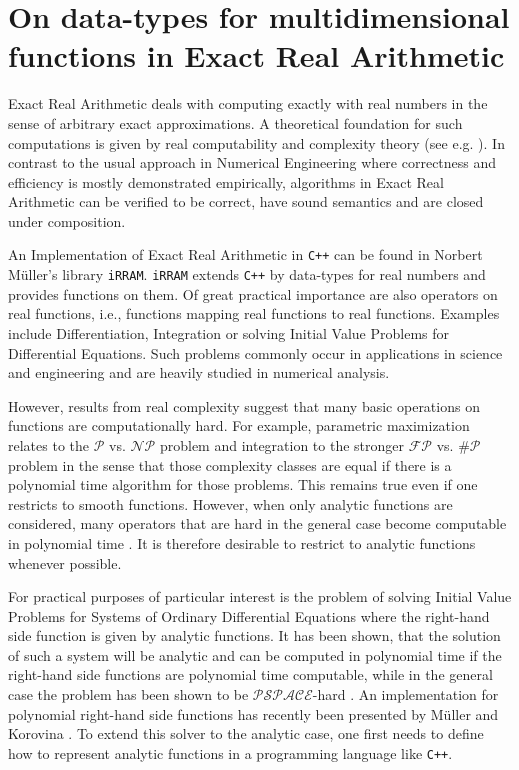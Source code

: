 \documentclass{article}
\newcommand{\p}{\ensuremath{\mathcal P}\xspace}
\newcommand{\np}{\ensuremath{\mathcal{NP}}\xspace}
\newcommand{\fp}{\ensuremath{\mathcal{FP}}\xspace}
\newcommand{\sharpp}{\ensuremath{\# \mathcal{P}}\xspace}
\newcommand{\pspace}{\ensuremath{ \mathcal{PSPACE}}\xspace}
\newcommand{\cc}{\texttt{C++}\xspace}
\newcommand{\irram}{\texttt{iRRAM}\xspace}
\begin{document}
\section*{On data-types for multidimensional functions in Exact Real Arithmetic}
Exact Real Arithmetic deals with computing exactly with real numbers in the sense of arbitrary exact approximations. 
A theoretical foundation for such computations is given by real computability and complexity theory (see e.g. \cite{MR0089809, MR1137517,Weihrauch}).
In contrast to the usual approach in Numerical Engineering where correctness and efficiency is mostly demonstrated empirically, algorithms in Exact Real Arithmetic can be verified to be correct, have sound semantics and are closed under composition.


An Implementation of Exact Real Arithmetic in \cc can be found in Norbert Müller's library \irram \cite{Mueller00}.
\irram extends \cc by data-types for real numbers and provides functions on them.
Of great practical importance are also operators on real functions, i.e., functions mapping real functions to real functions.
Examples include Differentiation, Integration or solving Initial Value Problems for Differential Equations.
Such problems commonly occur in applications in science and engineering and are heavily studied in numerical analysis.

However, results from real complexity suggest that many basic operations on functions are computationally hard. 
For example, parametric maximization relates to the $\p$ vs. $\np$ problem \cite{MR666209} and integration to the stronger $\fp$ vs. $\sharpp$ problem \cite{MR748898} in the sense that those complexity classes are equal if there is a polynomial time algorithm for those problems.
This remains true even if one restricts to smooth functions.
However, when only analytic functions are considered, many operators that are hard in the general case become computable in polynomial time \cite{Kawamura2012}.
It is therefore desirable to restrict to analytic functions whenever possible.

For practical purposes of particular interest is the problem of solving Initial Value Problems for Systems of Ordinary Differential Equations where the right-hand side function is given by analytic functions. 
It has been shown, that the solution of such a system will be analytic and can be computed in polynomial time if the right-hand side functions are polynomial time computable, while in the general case the problem has been shown to be \pspace-hard \cite{Kawamura10}.
An implementation for polynomial right-hand side functions has recently been presented by M\"{u}ller and Korovina \cite{DBLP:journals/corr/abs-1006-0401}.
To extend this solver to the analytic case, one first needs to define how to represent analytic functions in a programming language like \cc.
\end{document}
